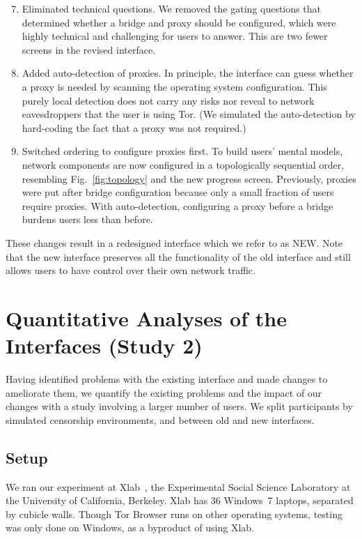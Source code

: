 \documentclass[USenglish,oneside,twocolumn]{article}
\begin{document}
\begin{enumerate}
\setcounter{enumi}{6}
\item Eliminated technical questions.  We removed the gating questions that determined whether a bridge and proxy should be configured, which were highly technical and challenging for users to answer. This are two fewer screens in the revised interface. 
\item Added auto-detection of proxies. In principle, the interface can guess whether a proxy is needed by scanning the operating system configuration. This purely local detection does not carry any risks nor reveal to network eavesdroppers that the user is using Tor. (We simulated the auto-detection by hard-coding the fact that a proxy was not required.)
\item Switched ordering to configure proxies first. To build users' mental models, network components are now configured in a topologically sequential order, resembling Fig.~\ref{fig:topology} and the new progress screen. Previously, proxies were put after bridge configuration because only a small fraction of users require proxies. With auto-detection, configuring a proxy before a bridge burdens users less than before.
\end{enumerate}

These changes result in a redesigned interface which we refer to as NEW. Note that the new interface preserves all the functionality of the old interface and still allows users to have control over their own network traffic. 

\section{Quantitative Analyses of the Interfaces (Study 2)}
\label{sec:quantitative}
Having identified problems with the existing interface
and made changes to ameliorate them,
we quantify the existing problems
and the impact of our changes with a study involving a larger number of users.
We split participants by simulated censorship environments,
and between old and new interfaces.

\subsection{Setup}
We ran our experiment at Xlab~\cite{xlab}, the Experimental Social Science Laboratory at the University of 
California, Berkeley. Xlab has 36 Windows~7 laptops, separated by cubicle walls. 
Though Tor Browser runs on other operating systems,
testing was only done on Windows, as a byproduct of using Xlab. 
\end{document}
